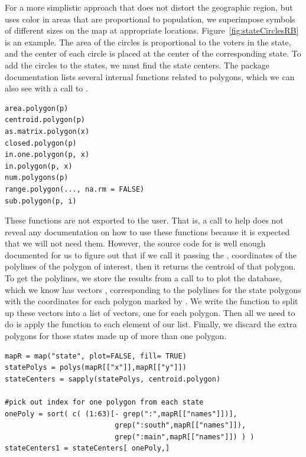 For a more simplistic approach that does not distort the geographic region,
but uses color in areas that are proportional to population, we superimpose symbols
of different sizes on the map at appropriate locations.
Figure~\ref{fig:stateCirclesRB} is an example. 
The area of the circles is proportional to the voters in the state, 
and the center of each circle is placed at the center of the corresponding state.
To add the circles to the states, we must find the state centers.
The  package documentation lists several 
internal functions related to polygons, which we can also see
with a call to .
\begin{verbatim}
area.polygon(p) 
centroid.polygon(p) 
as.matrix.polygon(x) 
closed.polygon(p) 
in.one.polygon(p, x)
in.polygon(p, x) 
num.polygons(p)
range.polygon(..., na.rm = FALSE) 
sub.polygon(p, i) 
\end{verbatim}

These functions are not exported to the user.
That is, a call to help does not reveal any documentation on how to use 
these functions because it is expected that we will not need them.
However, the source code for 
is well enough documented for us to figure  out that if we call 
it passing the , coordinates of the 
polylines of the polygon of interest, then it returns the centroid
of that polygon.
To get the polylines, we store the results from a call to 
 to plot the  database, which we know 
has vectors , corresponding to the polylines
for the state polygons with the coordinates for each polygon
marked by \SNA.  We write the function  to 
split up these vectors into a list of vectors, one for each
polygon. Then all we need to do is apply the  
function to each element of our list. Finally, we discard the extra polygons for 
those states made up of more than one polygon. 
\begin{verbatim}
mapR = map("state", plot=FALSE, fill= TRUE)
statePolys = polys(mapR[["x"]],mapR[["y"]])
stateCenters = sapply(statePolys, centroid.polygon)

#pick out index for one polygon from each state
onePoly = sort( c( (1:63)[- grep(":",mapR[["names"]])],
                          grep(":south",mapR[["names"]]),
                          grep(":main",mapR[["names"]]) ) )
stateCenters1 = stateCenters[ onePoly,]
\end{verbatim}

